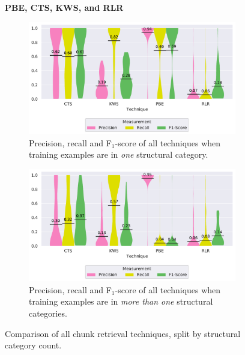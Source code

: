 \begin{figure}
\centering
    \textbf{PBE, CTS, KWS, and RLR}\par\medskip
\begin{subfigure}[b]{\columnwidth}
		\centering
                		\includegraphics[width=\columnwidth, clip]{img/big-study/recall-precision-singlecategory-all.pdf}
		\caption{Precision, recall and F$_{1}$-score of all techniques when training examples are in \emph{one} structural category.}
		\label{fig:recall-precision-singlecategory-all}
\end{subfigure}\hspace{\fill}
\begin{subfigure}[b]{\columnwidth}
		\centering
                		\centering
		\includegraphics[width=\columnwidth, clip]{img/big-study/recall-precision-multicategory-all.pdf}
		\caption{Precision, recall and F$_{1}$-score of all techniques when training examples are in \emph{more than one} structural categories.}
		\label{fig:recall-precision-multicategory-all}
\end{subfigure}
\caption{Comparison of all chunk retrieval techniques, split by structural category count.}
\end{figure}

